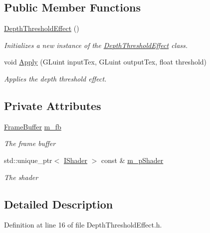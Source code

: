 \subsection*{Public Member Functions}
\begin{DoxyCompactItemize}
\item 
\hyperlink{class_depth_threshold_effect_ae4e0bf5ce9847f019acb17000868803f}{Depth\+Threshold\+Effect} ()
\begin{DoxyCompactList}\small\item\em Initializes a new instance of the \hyperlink{class_depth_threshold_effect}{Depth\+Threshold\+Effect} class. \end{DoxyCompactList}\item 
void \hyperlink{class_depth_threshold_effect_ad7d1a9f0995d81f3f8ef607ffd75fc6a}{Apply} (G\+Luint input\+Tex, G\+Luint output\+Tex, float threshold)
\begin{DoxyCompactList}\small\item\em Applies the depth threshold effect. \end{DoxyCompactList}\end{DoxyCompactItemize}
\subsection*{Private Attributes}
\begin{DoxyCompactItemize}
\item 
\hyperlink{class_frame_buffer}{Frame\+Buffer} \hyperlink{class_depth_threshold_effect_a37003be12ef10a17d7b0d3e74b4290b1}{m\+\_\+fb}
\begin{DoxyCompactList}\small\item\em The frame buffer \end{DoxyCompactList}\item 
std\+::unique\+\_\+ptr$<$ \hyperlink{class_i_shader}{I\+Shader} $>$ const \& \hyperlink{class_depth_threshold_effect_a46e4bba75a147b68b493f4aef1981893}{m\+\_\+p\+Shader}
\begin{DoxyCompactList}\small\item\em The shader \end{DoxyCompactList}\end{DoxyCompactItemize}


\subsection{Detailed Description}


Definition at line 16 of file Depth\+Threshold\+Effect.\+h.



